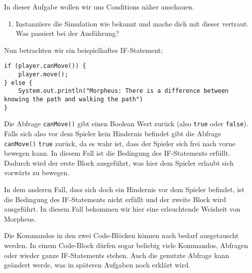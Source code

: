 

In dieser Aufgabe wollen wir uns Conditions näher anschauen.

\begin{enumerate}                           
    \item Instanziiere die Simulation wie bekannt und mache dich mit dieser vertraut.
        Was passiert bei der Ausführung?
\end{enumerate}


\begin{Infobox}[IF-Condition]
    Nun betrachten wir ein beispielhaftes IF-Statement:

    \begin{lstlisting}[breaklines=true, numbers=none]
if (player.canMove()) {
    player.move();
} else {
    System.out.println("Morpheus: There is a difference between knowing the path and walking the path")
}
    \end{lstlisting}

    Die Abfrage \lstinline{canMove()} gibt einen Boolean Wert zurück (also \lstinline{true} oder \lstinline{false}).
    Falls sich also vor dem Spieler kein Hindernis befindet gibt die Abfrage \lstinline{canMove()} \lstinline{true} zurück, da es wahr ist, dass der Spieler sich frei nach vorne bewegen kann.
    In diesem Fall ist die Bedingung des IF-Statements erfüllt. 
    Dadurch wird der erste Block ausgeführt, was hier dem Spieler erlaubt sich vorwärts zu bewegen. 

    In dem anderen Fall, dass sich doch ein Hindernis vor dem Spieler befindet, ist die Bedingung des IF-Statements nicht erfüllt und der zweite Block wird ausgeführt.
    In diesem Fall bekommen wir hier eine erleuchtende Weisheit von Morpheus.

    Die Kommandos in den zwei Code-Blöcken können nach bedarf ausgetauscht werden.
    In einem Code-Block dürfen sogar beliebig viele Kommandos, Abfragen oder wieder ganze IF-Statements stehen.
    Auch die genutzte Abfrage kann geändert werde, was in späteren Aufgaben noch erklärt wird.
\end{Infobox}



